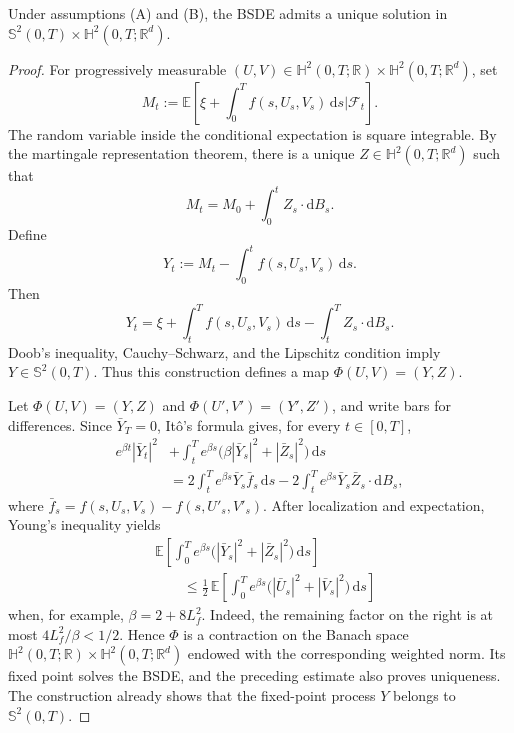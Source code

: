 \begin{thm}
Under assumptions \textup{(A)} and \textup{(B)}, the BSDE admits a unique
solution in
$\mathbb S^2(0,T)\times\mathbb H^2(0,T;\mathbb R^d)$.
\end{thm}

\begin{proof}
For progressively measurable
$(U,V)\in\mathbb H^2(0,T;\mathbb R)\times
\mathbb H^2(0,T;\mathbb R^d)$, set
\[
  M_t:=\mathbb E\!\left[
    \xi+\int_0^T f(s,U_s,V_s)\,\mathrm ds
    \mathrel{\big|}\mathcal F_t
  \right].
\]
The random variable inside the conditional expectation is square
integrable.  By the martingale representation theorem, there is a unique
$Z\in\mathbb H^2(0,T;\mathbb R^d)$ such that
\[
  M_t=M_0+\int_0^t Z_s\cdot\mathrm dB_s.
\]
Define
\[
  Y_t:=M_t-\int_0^t f(s,U_s,V_s)\,\mathrm ds.
\]
Then
\[
  Y_t=\xi+\int_t^T f(s,U_s,V_s)\,\mathrm ds
      -\int_t^T Z_s\cdot\mathrm dB_s.
\]
Doob's inequality, Cauchy--Schwarz, and the Lipschitz condition imply
$Y\in\mathbb S^2(0,T)$.  Thus this construction defines a map
$\Phi(U,V)=(Y,Z)$.

Let $\Phi(U,V)=(Y,Z)$ and
$\Phi(U',V')=(Y',Z')$, and write bars for differences.  Since
$\bar Y_T=0$, It\^o's formula gives, for every $t\in[0,T]$,
\[
\begin{aligned}
  e^{\beta t}|\bar Y_t|^2
  &+\int_t^T e^{\beta s}
    \bigl(\beta|\bar Y_s|^2+|\bar Z_s|^2\bigr)\,\mathrm ds \\
  &=2\int_t^T e^{\beta s}\bar Y_s\bar f_s\,\mathrm ds
    -2\int_t^T e^{\beta s}\bar Y_s\bar Z_s\cdot\mathrm dB_s,
\end{aligned}
\]
where $\bar f_s=f(s,U_s,V_s)-f(s,U'_s,V'_s)$.  After localization and
expectation, Young's inequality yields
\[
\begin{aligned}
  &\mathbb E\!\left[\int_0^T e^{\beta s}
    \bigl(|\bar Y_s|^2+|\bar Z_s|^2\bigr)\,\mathrm ds\right] \\
  &\qquad\le \frac12\,
  \mathbb E\!\left[\int_0^T e^{\beta s}
    \bigl(|\bar U_s|^2+|\bar V_s|^2\bigr)\,\mathrm ds\right]
\end{aligned}
\]
when, for example, $\beta=2+8L_f^2$.  Indeed, the remaining factor on
    the right is at most $4L_f^2/\beta<1/2$.  Hence $\Phi$ is a contraction on
the Banach space
$\mathbb H^2(0,T;\mathbb R)\times\mathbb H^2(0,T;\mathbb R^d)$ endowed
with the corresponding weighted norm.  Its fixed point solves the BSDE,
and the preceding estimate also proves uniqueness.  The construction
already shows that the fixed-point process $Y$ belongs to
$\mathbb S^2(0,T)$.
\end{proof}

